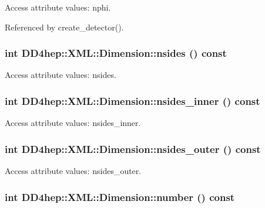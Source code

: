 Access attribute values: nphi. 

Referenced by create\_\-detector().\hypertarget{struct_d_d4hep_1_1_x_m_l_1_1_dimension_a2d8b7827cdd126398a07c81937f307e9}{
\subsubsection[{nsides}]{\setlength{\rightskip}{0pt plus 5cm}int DD4hep::XML::Dimension::nsides () const}}
\label{struct_d_d4hep_1_1_x_m_l_1_1_dimension_a2d8b7827cdd126398a07c81937f307e9}


Access attribute values: nsides. \hypertarget{struct_d_d4hep_1_1_x_m_l_1_1_dimension_aeef195971d2d39f221ad5e292e253fc4}{
\subsubsection[{nsides\_\-inner}]{\setlength{\rightskip}{0pt plus 5cm}int DD4hep::XML::Dimension::nsides\_\-inner () const}}
\label{struct_d_d4hep_1_1_x_m_l_1_1_dimension_aeef195971d2d39f221ad5e292e253fc4}


Access attribute values: nsides\_\-inner. \hypertarget{struct_d_d4hep_1_1_x_m_l_1_1_dimension_acac67e93cc9ffc70e29ab00bd1c23f5e}{
\subsubsection[{nsides\_\-outer}]{\setlength{\rightskip}{0pt plus 5cm}int DD4hep::XML::Dimension::nsides\_\-outer () const}}
\label{struct_d_d4hep_1_1_x_m_l_1_1_dimension_acac67e93cc9ffc70e29ab00bd1c23f5e}


Access attribute values: nsides\_\-outer. \hypertarget{struct_d_d4hep_1_1_x_m_l_1_1_dimension_a23f3ab6cc70dd70e7b6ac73f0be7d086}{
\subsubsection[{number}]{\setlength{\rightskip}{0pt plus 5cm}int DD4hep::XML::Dimension::number () const}}
\label{struct_d_d4hep_1_1_x_m_l_1_1_dimension_a23f3ab6cc70dd70e7b6ac73f0be7d086}


